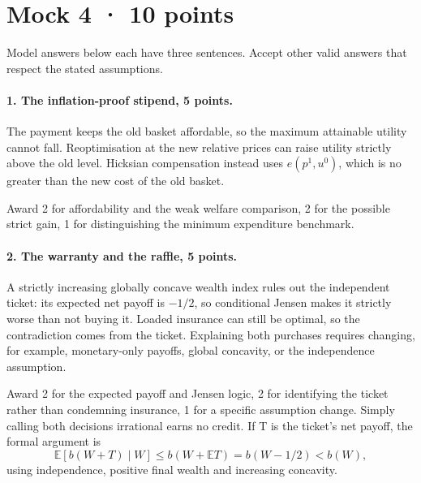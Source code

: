 \section*{Mock 4 · 10 points}
Model answers below each have three sentences. Accept other valid answers
that respect the stated assumptions.
\paragraph{1. The inflation-proof stipend, 5 points.}
The payment keeps the old basket affordable, so the maximum attainable
utility cannot fall. Reoptimisation at the new relative prices can raise
utility strictly above the old level. Hicksian compensation instead uses
$e(p^1,u^0)$, which is no greater than the new cost of the old basket.

Award 2 for affordability and the weak welfare comparison, 2 for the possible
strict gain, 1 for distinguishing the minimum expenditure benchmark.

\paragraph{2. The warranty and the raffle, 5 points.}
A strictly increasing globally concave wealth index rules out the independent ticket:
its expected net payoff is $-1/2$, so conditional Jensen makes it strictly
worse than not buying it. Loaded insurance can still be optimal, so the
contradiction comes from the ticket. Explaining both purchases requires
changing, for example, monetary-only payoffs, global concavity, or the
independence assumption.

Award 2 for the expected payoff and Jensen logic, 2 for identifying the
ticket rather than condemning insurance, 1 for a specific assumption change.
Simply calling both decisions irrational earns no credit. If T is the
ticket's net payoff, the formal argument is
\[
 \mathbb E[b(W+T)\mid W]\le b(W+\mathbb E T)=b(W-1/2)<b(W),
\]
using independence, positive final wealth and increasing concavity.
